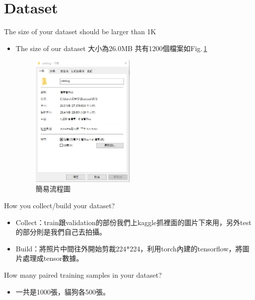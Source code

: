 \documentclass{beamer}
\begin{document}
\section{Dataset}


\begin{frame}{The size of your dataset should be larger than 1K }
\begin{CJK*}{UTF8}{bsmi}
  \begin{itemize}
  \item {
The size of our dataset 大小為26.0MB 共有1200個檔案如Fig.\,\ref{fig:1} \\
\begin{figure}[h]
\begin{center}
\includegraphics[width=5cm]{dataset.jpg} 
\end{center} 
\label{fig:1} 
\caption{簡易流程圖} 
\end{figure}
  }
  \end{itemize}
\end{CJK*}
\end{frame}

\begin{frame}{How you collect/build your dataset?}
\begin{CJK*}{UTF8}{bsmi}
  \begin{itemize}
  \item {
    Collect：train跟validation的部份我們上kaggle抓裡面的圖片下來用，另外test的部分則是我們自己去拍攝。
  }
  \item {
    Build：將照片中間往外開始剪裁224*224，利用torch內建的tensorflow，將圖片處理成tensor數據。
  }
  \end{itemize}
\end{CJK*}
\end{frame}

\begin{frame}{How many paired training samples in your dataset?}
\begin{CJK*}{UTF8}{bsmi}
  \begin{itemize}
  \item {
    一共是1000張，貓狗各500張。
  }
  \end{itemize}
\end{CJK*}
\end{frame}
\end{document}
